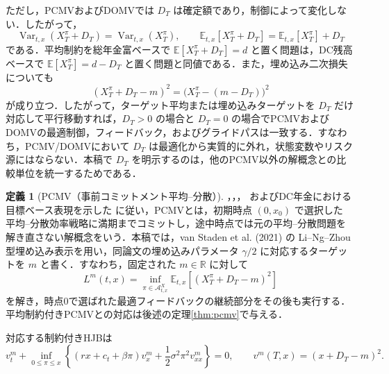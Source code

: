 \documentclass[10pt,a4paper]{article}
\theoremstyle{plain}
\theoremstyle{definition}
\newtheorem{definition}{定義}
\newcommand{\E}{\mathbb{E}}
\DeclareMathOperator{\Var}{Var}
\newcommand{\R}{\mathbb{R}}
\newcommand{\A}{\mathcal{A}}
\begin{document}
ただし，PCMVおよびDOMVでは $D_T$ は確定額であり，制御によって変化しない．したがって，
\begin{equation}
  \Var_{t,x}(X_T^\pi+D_T)=\Var_{t,x}(X_T^\pi),
  \qquad
  \E_{t,x}[X_T^\pi+D_T]=\E_{t,x}[X_T^\pi]+D_T
  \label{eq:deterministic-db-shift}
\end{equation}
である．平均制約を総年金富ベースで $\E[X_T^\pi+D_T]=d$ と置く問題は，DC残高ベースで $\E[X_T^\pi]=d-D_T$ と置く問題と同値である．また，埋め込み二次損失についても
\begin{equation}
  (X_T^\pi+D_T-m)^2
  =\bigl(X_T^\pi-(m-D_T)\bigr)^2
  \label{eq:deterministic-db-target-shift}
\end{equation}
が成り立つ．したがって，ターゲット平均または埋め込みターゲットを $D_T$ だけ対応して平行移動すれば，$D_T>0$ の場合と $D_T=0$ の場合でPCMVおよびDOMVの最適制御，フィードバック，およびグライドパスは一致する．すなわち，PCMV/DOMVにおいて $D_T$ は最適化から実質的に外れ，状態変数やリスク源にはならない．本稿で $D_T$ を明示するのは，他のPCMV以外の解概念との比較単位を統一するためである．

\begin{definition}[PCMV（事前コミットメント平均--分散）]
\label{def:pcmv}
\citet{vanStadenDangForsyth2021}，\citet{LiNg2000}，\citet{ZhouLi2000}，
およびDC年金における目標ベース表現を示した \citet{HojgaardVigna2007,Vigna2014,MenoncinVigna2017} に従い，PCMVとは，初期時点 $(0,x_0)$ で選択した
平均--分散効率戦略に満期までコミットし，途中時点では元の平均--分散問題を
解き直さない解概念をいう．本稿では，van Staden et al. (2021) の
Li--Ng--Zhou型埋め込み表示を用い，同論文の埋め込みパラメータ
$\gamma/2$ に対応するターゲットを $m$ と書く．すなわち，固定された
$m\in\R$ に対して
\begin{equation}
  L^m(t,x)=\inf_{\pi\in\A^X_{t,x}}
  \E_{t,x}\left[(X_T^\pi+D_T-m)^2\right]
  \label{eq:embedded-x}
\end{equation}
を解き，時点0で選ばれた最適フィードバックの継続部分をその後も実行する．
平均制約付きPCMVとの対応は後述の定理\ref{thm:pcmv}で与える．
\end{definition}

対応する制約付きHJBは
\begin{equation}
  v_t^m+
  \inf_{0\leq\pi\leq x}
  \left\{
  (rx+c_t+\beta\pi)v_x^m
  +\frac12\sigma^2\pi^2v_{xx}^m
  \right\}=0,
  \qquad
  v^m(T,x)=(x+D_T-m)^2.
  \label{eq:pcmv-hjb-x}
\end{equation}
\end{document}
